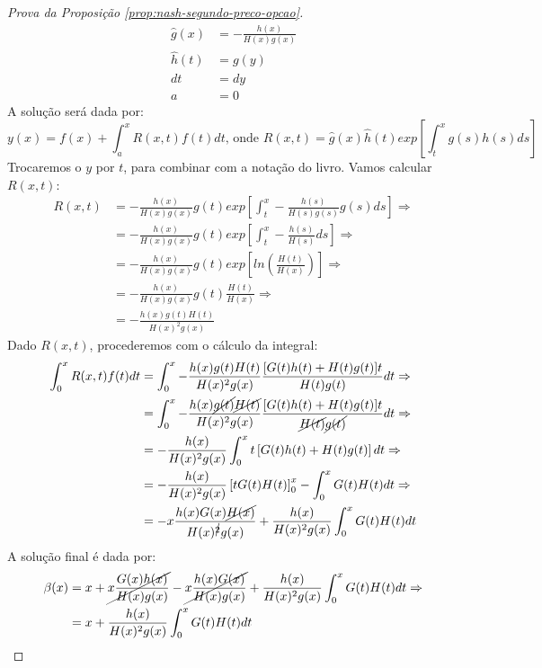 \begin{proof}[Prova da Proposição \ref{prop:nash-segundo-preco-opcao}]
\begin{align*}
		\widehat{g}(x) & = -\frac{h(x)}{H(x)g(x)} \\
		\widehat{h}(t) & = g(y) \\
		dt &= dy \\
		a &= 0
	\end{align*}
	A solução será dada por:
	\begin{equation*}
		y(x) = f(x) + \int_a^x R(x,t)f(t)dt \text{, onde } R(x,t) = \widehat{g}(x)\widehat{h}(t)exp\left[ \int_t^x g(s)h(s)ds \right]
	\end{equation*}
	Trocaremos o $y$ por $t$, para combinar com a notação do livro. Vamos calcular $R(x,t)$:
	\begin{align*}
		R(x,t) & = -\frac{h(x)}{H(x)g(x)} g(t) exp\left[ \int_t^x -\frac{h(s)}{H(s)g(s)}g(s)ds \right] \Rightarrow \\
		& = -\frac{h(x)}{H(x)g(x)} g(t) exp\left[ \int_t^x -\frac{h(s)}{H(s)}ds \right] \Rightarrow \\
		& = -\frac{h(x)}{H(x)g(x)} g(t) exp\left[ ln \left( \frac{H(t)}{H(x)} \right) \right] \Rightarrow \\
		& = -\frac{h(x)}{H(x)g(x)} g(t) \frac{H(t)}{H(x)} \Rightarrow \\
		& = -\frac{h(x)g(t)H(t)}{H(x)^2g(x)}
	\end{align*}
	Dado $R(x,t)$, procederemos com o cálculo da integral:
	\begin{align*}
		\int_0^x R(x,t)f(t)dt & = \int_0^x -\frac{h(x)g(t)H(t)}{H(x)^2g(x)} \frac{[G(t)h(t)+H(t)g(t)]t}{H(t)g(t)} dt \Rightarrow \\
		& = \int_0^x -\frac{h(x)\cancel{g(t)}\cancel{H(t)}}{H(x)^2g(x)} \frac{[G(t)h(t)+H(t)g(t)]t}{\cancel{H(t)}\cancel{g(t)}} dt \Rightarrow \\
		& = -\frac{h(x)}{H(x)^2g(x)} \int_0^x  t \left[ G(t)h(t)+H(t)g(t) \right] dt \Rightarrow \\
		& = -\frac{h(x)}{H(x)^2g(x)} \left[ tG(t)H(t) \right]_0^x -\int_0^x G(t)H(t)dt \Rightarrow \\
		& = -x \frac{h(x)G(x)\cancel{H(x)}}{H(x)^{\cancel{2}}g(x)} + \frac{h(x)}{H(x)^2g(x)}\int_0^x G(t)H(t)dt
	\end{align*}
	A solução final é dada por:
	\begin{align*}
		\beta(x) & = x + \cancel{x \frac{G(x)h(x)}{H(x)g(x)}} - \cancel{x \frac{h(x)G(x)}{H(x)g(x)}} + \frac{h(x)}{H(x)^2g(x)}\int_0^x G(t)H(t)dt \Rightarrow \\
		& = x + \frac{h(x)}{H(x)^2g(x)}\int_0^x G(t)H(t)dt
	\end{align*}
\end{proof}

